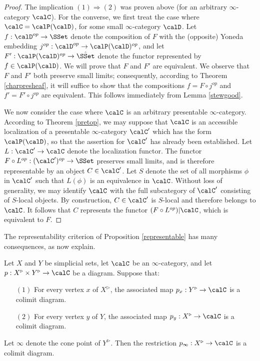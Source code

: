 \begin{proof}
The implication $(1) \Rightarrow (2)$ was proven above (for an arbitrary $\infty$-category $\calC$).
For the converse, we first treat the case where $\calC = \calP(\calD)$, for some small $\infty$-category $\calD$. Let $f: \calD^{op} \rightarrow \SSet$ denote the composition
of $F$ with the (opposite) Yoneda embedding $j^{op}: \calD^{op} \rightarrow \calP(\calD)^{op}$, and let $F': \calP(\calD)^{op} \rightarrow \hat{\SSet}$ denote the functor represented by
$f \in \calP(\calD)$. We will prove that $F$ and $F'$ are equivalent. We observe that
$F$ and $F'$ both preserve small limits; consequently, according to Theorem \ref{charpresheaf}, it will suffice to show that the compositions $f = F \circ j^{op}$ and $f' = F' \circ j^{op}$ are equivalent.
This follows immediately from Lemma \ref{stewgood}.

We now consider the case where $\calC$ is an arbitrary presentable $\infty$-category.
According to Theorem \ref{pretop}, we may suppose that $\calC$ is an accessible localization of a presentable $\infty$-category $\calC'$ which has the form $\calP(\calD)$, so that the assertion for $\calC'$ has already been established. Let $L: \calC' \rightarrow \calC$ denote the localization functor. The functor $F \circ L^{op}: (\calC')^{op} \rightarrow \SSet$ preserves small limits, and is therefore representable by an object
$C \in \calC'$. Let $S$ denote the set of all morphisms $\phi$ in $\calC'$ such that
$L(\phi)$ is an equivalence in $\calC$. Without loss of generality, we may identify
$\calC$ with the full subcategory of $\calC'$ consisting of $S$-local objects. By construction,
$C \in \calC'$ is $S$-local and therefore belongs to $\calC$. It follows that
$C$ represents the functor $(F \circ L^{op})| \calC$, which is equivalent to $F$.
\end{proof}

The representability criterion of Proposition \ref{representable}
has many consequences, as now explain.

\begin{lemma}\label{limitscommute}
Let $X$ and $Y$ be simplicial sets, let $\calC$ be an $\infty$-category, and let
$p: X^{\triangleright} \times Y^{\triangleright} \rightarrow \calC$ be a diagram.
Suppose that:
\begin{itemize}
\item[$(1)$] For every vertex $x$ of $X^{\triangleright}$, the associated map
$p_{x}: Y^{\triangleright} \rightarrow \calC$ is a colimit diagram.
\item[$(2)$] For every vertex $y$ of $Y$, the associated map
$p_{y}: X^{\triangleright} \rightarrow \calC$ is a colimit diagram.
\end{itemize}
Let $\infty$ denote the cone point of $Y^{\triangleright}$. Then the restriction
$p_{\infty}: X^{\triangleright} \rightarrow \calC$ is a colimit diagram. 
\end{lemma}

